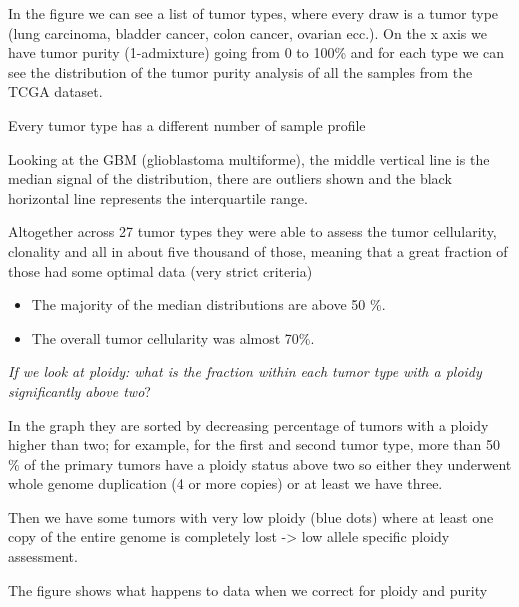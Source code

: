 In the figure we can see a list of tumor types, where every draw is a tumor type
(lung carcinoma, bladder cancer, colon cancer, ovarian ecc.). On the x axis we
have tumor purity (1-admixture) going from 0 to 100\% and for each type we can
see the distribution of the tumor purity analysis of all the samples from the
TCGA dataset.

Every tumor type has a different number of sample profile

Looking at the GBM (glioblastoma multiforme), the middle vertical line is the
median signal of the distribution, there are outliers shown and the black
horizontal line represents the interquartile range.

Altogether across 27 tumor types they were able to assess the tumor cellularity,
clonality and all in about five thousand of those, meaning that a great fraction
of those had some optimal data (very strict criteria)

\begin{itemize}
\item
  The majority of the median distributions are above 50 \%.
\item
  The overall tumor cellularity was almost 70\%.
\end{itemize}

\emph{If we look at ploidy: what is the fraction within each tumor type with a
ploidy significantly above two}?

In the graph they are sorted by decreasing percentage of tumors with a ploidy
higher than two; for example, for the first and second tumor type, more than 50
\% of the primary tumors have a ploidy status above two so either they underwent
whole genome duplication (4 or more copies) or at least we have three.

Then we have some tumors with very low ploidy (blue dots) where at least one
copy of the entire genome is completely lost -\textgreater{} low allele specific
ploidy assessment.

The figure shows what happens to data when we correct for ploidy and purity

